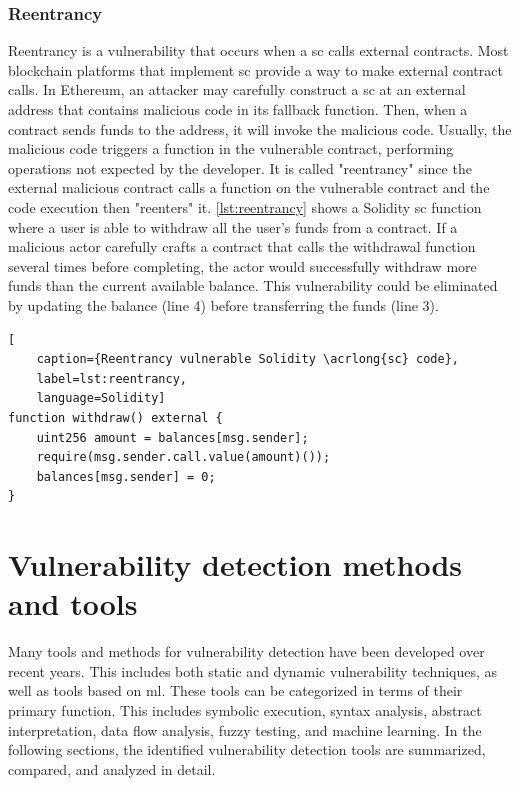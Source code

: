 \subsubsection{Reentrancy}
Reentrancy is a vulnerability that occurs when a \acrshort{sc} calls external contracts. Most blockchain platforms that implement \acrshort{sc} provide a way to make external contract calls. In Ethereum, an attacker may carefully construct a \acrshort{sc} at an external address that contains malicious code in its fallback function. Then, when a contract sends funds to the address, it will invoke the malicious code. Usually, the malicious code triggers a function in the vulnerable contract, performing operations not expected by the developer. It is called "reentrancy" since the external malicious contract calls a function on the vulnerable contract and the code execution then "reenters" it. \cref{lst:reentrancy} shows a Solidity \acrshort{sc} function where a user is able to withdraw all the user's funds from a contract. If a malicious actor carefully crafts a contract that calls the withdrawal function several times before completing, the actor would successfully withdraw more funds than the current available balance. This vulnerability could be eliminated by updating the balance (line 4) before transferring the funds (line 3).

\begin{lstlisting}[
    caption={Reentrancy vulnerable Solidity \acrlong{sc} code},
    label=lst:reentrancy,
    language=Solidity]
function withdraw() external {
    uint256 amount = balances[msg.sender];
    require(msg.sender.call.value(amount)());
    balances[msg.sender] = 0;
}   
\end{lstlisting}



\section{Vulnerability detection methods and tools}
\label{sec:vulnerability-detection-methods-and-tools}
Many tools and methods for vulnerability detection have been developed over recent years. This includes both static and dynamic vulnerability techniques, as well as tools based on \acrfull{ml}. These tools can be categorized in terms of their primary function. This includes symbolic execution, syntax analysis, abstract interpretation, data flow analysis, fuzzy testing, and machine learning. In the following sections, the identified vulnerability detection tools are summarized, compared, and analyzed in detail.

